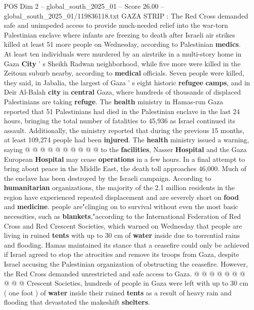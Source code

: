 \begin{textsample}{POS Dim 2 – global\_south\_2025\_01 – Score 26.00 – global\_south\_2025\_01/119836118.txt}  \label{ex:f2_pos_316}
GAZA STRIP : The Red Cross demanded safe and unimpeded access to provide much-needed relief into the war-torn Palestinian enclave where infants are freezing to death after Israeli air strikes killed at least 51 more people on Wednesday, according to Palestinian \textbf{medics}.
At least ten individuals were murdered by an airstrike in a multi-story home in Gaza \textbf{City} ' s Sheikh Radwan neighborhood, while five more were killed in the Zeitoun suburb nearby, according to \textbf{medical} officials.
Seven people were killed, they said, in Jabalia, the largest of Gaza ' s eight historic \textbf{refugee} \textbf{camps}, and in Deir Al-Balah \textbf{city} in \textbf{central} Gaza, where hundreds of thousands of displaced Palestinians are taking \textbf{refuge}.
The \textbf{health} ministry in Hamas-run Gaza reported that 51 Palestinians had died in the Palestinian enclave in the last 24 hours, bringing the total number of fatalities to 45,936 as Israel continued its assault.
Additionally, the ministry reported that during the previous 15 months, at least 109,274 people had been \textbf{injured}.
The \textbf{health} ministry issued a warning, saying @ @ @ @ @ @ @ @ @ @ to the \textbf{facilities}, Nasser \textbf{Hospital} and the Gaza European \textbf{Hospital} may cease \textbf{operations} in a few hours.
In a final attempt to bring about peace in the Middle East, the death toll approaches 46,000.
Much of the enclave has been destroyed by the Israeli campaign.
According to \textbf{humanitarian} organizations, the majority of the 2.1 million residents in the region have experienced repeated displacement and are severely short on \textbf{food} and \textbf{medicine}. people are"clinging on to survival without even the most basic necessities, such as \textbf{blankets},"according to the International Federation of Red Cross and Red Crescent Societies, which warned on Wednesday that people are living in ruined \textbf{tents} with up to 30 cm of \textbf{water} inside due to torrential rains and flooding.
Hamas maintained its stance that a ceasefire could only be achieved if Israel agreed to stop the atrocities and remove its troops from Gaza, despite Israel accusing the Palestinian organization of obstructing the ceasefire.
However, the Red Cross demanded unrestricted and safe access to Gaza. @ @ @ @ @ @ @ @ @ @ Crescent Societies, hundreds of people in Gaza were left with up to 30 cm ( one foot ) of \textbf{water} inside their ruined \textbf{tents} as a result of heavy rain and flooding that devastated the makeshift \textbf{shelters}.

\end{textsample}

